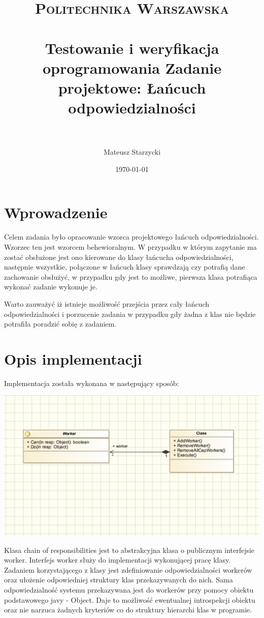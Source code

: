 \documentclass[paper=a4, fontsize=11pt]{scrartcl} %
\title{ 
    \normalfont \normalsize 
    \textsc{Politechnika Warszawska} \\ [25pt] %
    \horrule{0.5pt} \\[0.4cm] %
    \huge Testowanie i weryfikacja oprogramowania Zadanie projektowe: Łańcuch odpowiedzialności\\ %
    \horrule{2pt} \\[0.5cm] %
}
\author{Mateusz Starzycki} %
\date{\normalsize\today} %
\numberwithin{equation}{section} %
\numberwithin{figure}{section} %
\numberwithin{table}{section} %
\begin{document}
\maketitle %


\newpage

\section{Wprowadzenie}


Celem zadania było opracowanie wzorca projektowego łańcuch odpowiedzialności.
Wzorzec ten jest wzorcem behewioralnym. W przypadku w którym zapytanie ma zostać obsłużone
jest ono kierowane do klasy łańcucha odpowiedzialności, następnie wszystkie, połączone w
łańcuch klasy sprawdzają czy potrafią dane zachowanie obsłużyć, w przypadku gdy jest to możliwe,
pierwsza klasa potrafiąca wykonać zadanie wykonuje je.

Warto zauważyć iż istnieje możliwość przejścia przez cały łańcuch odpowiedzialności i porzucenie
zadania w przypadku gdy żadna z klas nie będzie potrafiła poradzić sobię z zadaniem.

\section{Opis implementacji}

Implementacja została wykonana w następujący sposób:

\includegraphics[width=\textwidth]{5}

Klasa chain of responsibilities jest to abstrakcyjna klasa o publicznym interfejsie worker.
Interfejs worker służy do implementacji wykonującej pracę klasy. Zadaniem korzystającego z klasy
jest zdefiniowanie odpowiedzialności workerów oraz ułożenie odpowiedniej struktury klas przekazywanych
do nich. Sama odpowiedzialność systemu przekazywana jest do workerów przy pomocy obiektu podstawowego
javy - Object. Daje to możliwość ewentualnej introspekcji obiektu oraz nie narzuca żadnych kryteriów
co do struktury hierarchi klas w programie.
\end{document}

